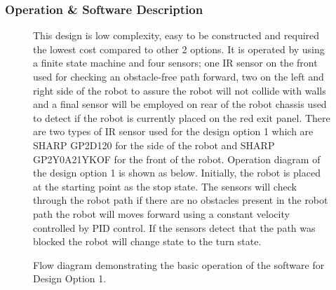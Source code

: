 \documentclass[a4paper]{article}
\begin{document}
\subsubsection{Operation \& Software Description}
\begin{figure}[h]
\begin{minipage}{0.45\textwidth}
This design is low complexity, easy to be constructed and required the lowest cost compared to other 2 options. It is operated by using a finite state machine and four sensors;  one IR sensor on the front used for checking an obstacle-free path forward, two on the left and right side of the robot to assure the robot will not collide with walls and a final sensor will be employed on rear of the robot chassis used to detect if the robot is currently placed on the red exit panel. There are two types of IR sensor used for the design option 1 which are SHARP GP2D120 for the side of the robot and SHARP GP2Y0A21YKOF for the front of the robot. Operation diagram of the design option 1 is shown as below. Initially, the robot is placed at the starting point as the stop state. The sensors will check through the robot path if there are no obstacles present in the robot path the robot will moves forward using a constant velocity controlled by PID control. If the sensors detect that the path was blocked the robot will change state to the turn state. 
\end{minipage}
\hspace{1cm}
\begin{minipage}{0.45\textwidth}
\centering
{}
\caption{Flow diagram demonstrating the basic operation of the software for Design Option 1.}
\end{minipage}
\end{figure}
\end{document}
